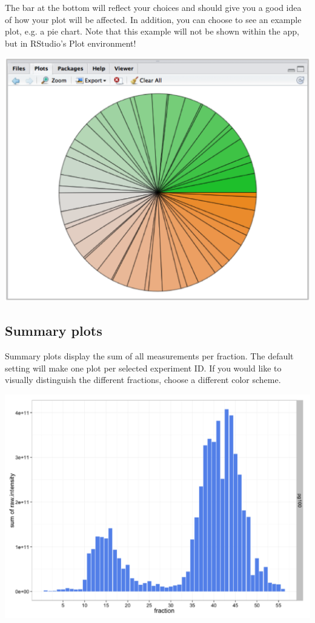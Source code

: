 \documentclass[letterpaper, twocolumn, 9pt]{article}
\begin{document}
The bar at the bottom will reflect your choices and should give you a good idea of how your plot will be affected. In addition, you can choose to see an example plot, e.g. a pie chart.
Note that this example will not be shown within the app, but in RStudio's \textsf{Plot} environment!
\begin{center}
\includegraphics[width=.95\columnwidth]{figures/ss_colorscheme_example.png}
\end{center}

\subsection{Summary plots}

Summary plots display the sum of all measurements per fraction.
The default setting will make one plot per selected experiment ID.
If you would like to visually distinguish the different fractions, choose a different color scheme.

\begin{center}
\includegraphics[scale=.4]{figures/ss_sumPlot_example.png}
\end{center}
\end{document}
